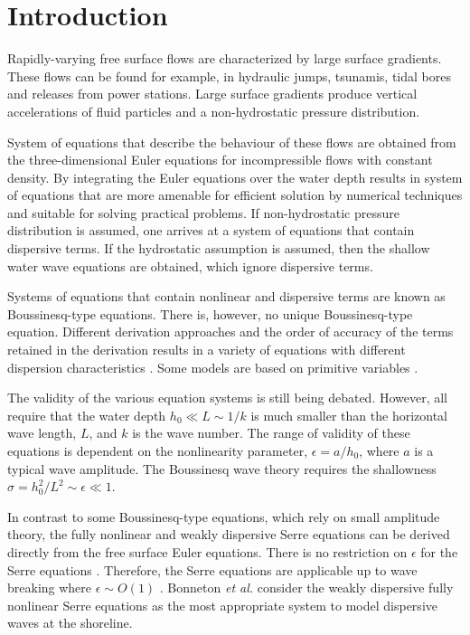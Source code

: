 \documentclass[SingleSpace,12pt]{Serre_ASCE}
\begin{document}
\linenumbers

\section{Introduction} \label{intro}

Rapidly-varying free surface flows are characterized by large surface gradients. These flows can be found for example, in hydraulic jumps, tsunamis, tidal bores and releases from power stations. Large surface gradients produce vertical accelerations of fluid particles and a non-hydrostatic pressure distribution.

System of equations that describe the behaviour of these flows are obtained from the three-dimensional Euler equations for incompressible flows with constant density. By integrating the Euler equations over the water depth results in system of equations that are more amenable for efficient solution by numerical techniques and suitable for solving practical problems. If non-hydrostatic pressure distribution is assumed, one arrives at a system of equations that contain dispersive terms. If the hydrostatic assumption is assumed, then the shallow water wave equations are obtained, which ignore dispersive terms.

Systems of equations that contain nonlinear and dispersive terms are known as Boussinesq-type equations. There is, however, no unique Boussinesq-type equation. Different derivation approaches and the order of accuracy of the terms retained in the derivation results in a variety of equations with different dispersion characteristics  \cite{Madsen-etal-1991-371}. Some models are based on primitive variables  \cite{Shiach-Mingham-2009-32}.

The validity of the various equation systems is still being debated. However, all require that the water depth $h_0 \ll L \sim 1/k$ is much smaller than the horizontal wave length, $L$, and $k$ is the wave number. The range of validity of these equations is dependent on the nonlinearity parameter, $\epsilon = a/h_0$, where $a$ is a typical wave amplitude.  The Boussinesq wave theory requires the shallowness $\sigma = h_0^2/L^2 \sim \epsilon \ll 1$.

In contrast to some Boussinesq-type equations, which rely on small amplitude theory, the fully nonlinear and weakly dispersive Serre equations can be derived directly from the free surface Euler equations. There is no restriction on $\epsilon$ for the Serre equations \cite{Li-Y-2006-1255}. Therefore, the Serre equations are applicable up to wave breaking where $\epsilon \sim O(1)$ \cite{Barthelemy-E-2004-315}. Bonneton \emph{et al.}  \cite{Bonneton-etal-2011-1479,Bonneton-etal-2011-589} consider the weakly dispersive fully nonlinear Serre equations as the most appropriate system to model dispersive waves at the shoreline.
\end{document}
